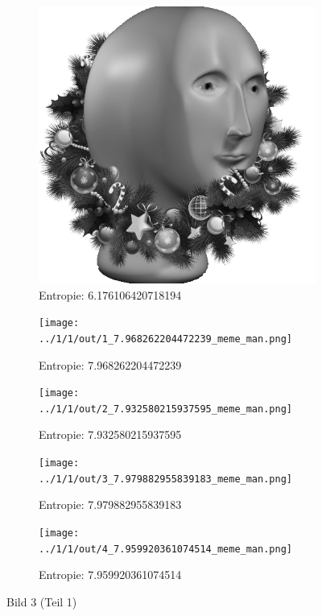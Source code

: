 \begin{figure}
	\centering

	\begin{subfigure}{0.25\textwidth}
		\includegraphics[width=\textwidth]{../1/3/gray_6.176106420718194_meme_man.png}
		\caption{Entropie: 6.176106420718194}
	\end{subfigure}

	\begin{subfigure}{0.25\textwidth}
		\texttt{[image: ../1/1/out/1\_7.968262204472239\_meme\_man.png]}
		\caption{Entropie: 7.968262204472239}
	\end{subfigure}

	\begin{subfigure}{0.25\textwidth}
		\texttt{[image: ../1/1/out/2\_7.932580215937595\_meme\_man.png]}
		\caption{Entropie: 7.932580215937595}
	\end{subfigure}

	\begin{subfigure}{0.25\textwidth}
		\texttt{[image: ../1/1/out/3\_7.979882955839183\_meme\_man.png]}
		\caption{Entropie: 7.979882955839183}
	\end{subfigure}

	\begin{subfigure}{0.25\textwidth}
		\texttt{[image: ../1/1/out/4\_7.959920361074514\_meme\_man.png]}
		\caption{Entropie: 7.959920361074514}
	\end{subfigure}
	\caption{Bild 3 (Teil 1)}
\end{figure}
